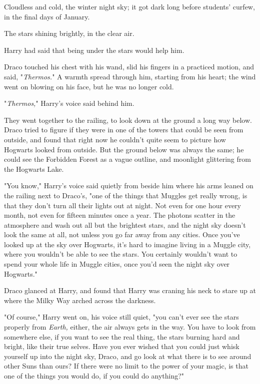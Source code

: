 Cloudless and cold, the winter night sky; it got dark long before students'
curfew, in the final days of January.

The stars shining brightly, in the clear air.

Harry had said that being under the stars would help him.

Draco touched his chest with his wand, slid his fingers in a practiced motion,
and said, "\emph{Thermos.}" A warmth spread through him, starting from his
heart; the wind went on blowing on his face, but he was no longer cold.

"\emph{Thermos,}" Harry's voice said behind him.

They went together to the railing, to look down at the ground a long way below.
Draco tried to figure if they were in one of the towers that could be seen from
outside, and found that right now he couldn't quite seem to picture how
Hogwarts looked from outside. But the ground below was always the same; he
could see the Forbidden Forest as a vague outline, and moonlight glittering
from the Hogwarts Lake.

"You know," Harry's voice said quietly from beside him where his arms leaned on
the railing next to Draco's, "one of the things that Muggles get really wrong,
is that they don't turn all their lights out at night. Not even for one hour
every month, not even for fifteen minutes once a year. The photons scatter in
the atmosphere and wash out all but the brightest stars, and the night sky
doesn't look the same at all, not unless you go far away from any cities. Once
you've looked up at the sky over Hogwarts, it's hard to imagine living in a
Muggle city, where you wouldn't be able to see the stars. You certainly
wouldn't want to spend your whole life in Muggle cities, once you'd seen the
night sky over Hogwarts."

Draco glanced at Harry, and found that Harry was craning his neck to stare up
at where the Milky Way arched across the darkness.

"Of course," Harry went on, his voice still quiet, "you can't ever see the
stars properly from \emph{Earth,} either, the air always gets in the way. You
have to look from somewhere else, if you want to see the real thing, the stars
burning hard and bright, like their true selves. Have you ever wished that you
could just whisk yourself up into the night sky, Draco, and go look at what
there is to see around other Suns than ours? If there were no limit to the
power of your magic, is that one of the things you would do, if you could do
anything?"

